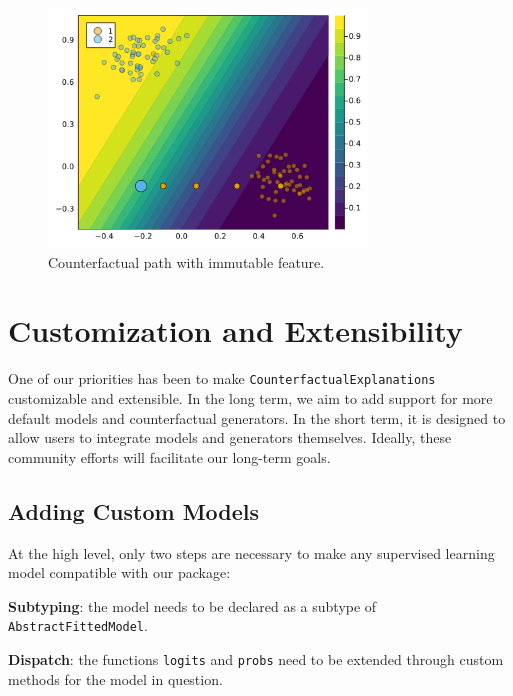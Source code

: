 \documentclass[
  letterpaper,
  DIV=11,
  numbers=noendperiod]{scrartcl}
\begin{document}
\begin{figure}

{\centering \includegraphics[width=3.33333in,height=2.5in]{www/constraint_mutability.png}

}

\caption{\label{fig-mutability}Counterfactual path with immutable
feature.}

\end{figure}

\hypertarget{sec-custom}{%
\section{Customization and Extensibility}\label{sec-custom}}

One of our priorities has been to make
\texttt{CounterfactualExplanations} customizable and extensible. In the
long term, we aim to add support for more default models and
counterfactual generators. In the short term, it is designed to allow
users to integrate models and generators themselves. Ideally, these
community efforts will facilitate our long-term goals.

\hypertarget{sec-custom-mod}{%
\subsection{Adding Custom Models}\label{sec-custom-mod}}

At the high level, only two steps are necessary to make any supervised
learning model compatible with our package:

\begin{unnumlist}
\item \textbf{Subtyping}: the model needs to be declared as a subtype of \texttt{AbstractFittedModel}.
\item \textbf{Dispatch}: the functions \texttt{logits} and \texttt{probs} need to be extended through custom methods for the model in question.
\end{unnumlist}
\end{document}
